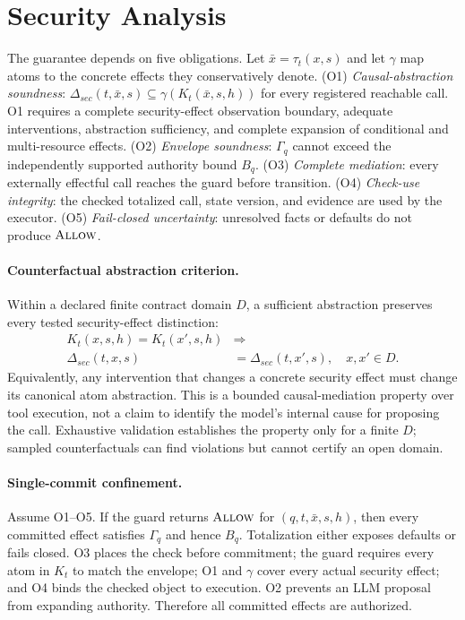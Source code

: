 \section{Security Analysis}

The guarantee depends on five obligations. Let $\bar{x}=\tau_t(x,s)$ and let $\gamma$ map atoms to the concrete effects they conservatively denote. (O1) \emph{Causal-abstraction soundness}: $\Delta_{sec}(t,\bar{x},s)\subseteq\gamma(K_t(\bar{x},s,h))$ for every registered reachable call. O1 requires a complete security-effect observation boundary, adequate interventions, abstraction sufficiency, and complete expansion of conditional and multi-resource effects. (O2) \emph{Envelope soundness}: $\Gamma_q$ cannot exceed the independently supported authority bound $B_q$. (O3) \emph{Complete mediation}: every externally effectful call reaches the guard before transition. (O4) \emph{Check-use integrity}: the checked totalized call, state version, and evidence are used by the executor. (O5) \emph{Fail-closed uncertainty}: unresolved facts or defaults do not produce $\textsc{Allow}$.

\paragraph{Counterfactual abstraction criterion.}
Within a declared finite contract domain $D$, a sufficient abstraction preserves every tested security-effect distinction:
\[
\begin{aligned}
  K_t(x,s,h)=K_t(x',s,h)&\Longrightarrow{}\\
  \Delta_{sec}(t,x,s)&=\Delta_{sec}(t,x',s),\quad x,x'\in D.
\end{aligned}
\]
Equivalently, any intervention that changes a concrete security effect must change its canonical atom abstraction. This is a bounded causal-mediation property over tool execution, not a claim to identify the model's internal cause for proposing the call. Exhaustive validation establishes the property only for a finite $D$; sampled counterfactuals can find violations but cannot certify an open domain.

\paragraph{Single-commit confinement.}
Assume O1--O5. If the guard returns $\textsc{Allow}$ for $(q,t,\bar{x},s,h)$, then every committed effect satisfies $\Gamma_q$ and hence $B_q$. Totalization either exposes defaults or fails closed. O3 places the check before commitment; the guard requires every atom in $K_t$ to match the envelope; O1 and $\gamma$ cover every actual security effect; and O4 binds the checked object to execution. O2 prevents an LLM proposal from expanding authority. Therefore all committed effects are authorized.

